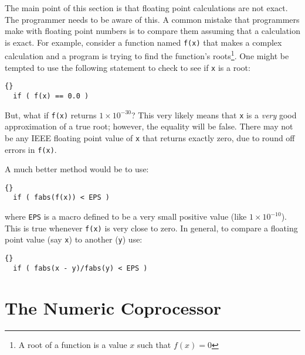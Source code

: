 {The main point of this section is that floating point calculations are
not exact. The programmer needs to be aware of this. A common mistake that
programmers make with floating point numbers is to compare them assuming
that a calculation is exact. For example, consider a function named
\lstinline|f(x)| that makes a complex calculation and a program is
trying to find the function's roots\footnote{A root of a function is a 
value $x$ such that $f(x) = 0$}. One might be tempted to use the following
statement to check to see if \lstinline|x| is a root:
\begin{lstlisting}[stepnumber=0]{}
  if ( f(x) == 0.0 )
\end{lstlisting}
But, what if \lstinline|f(x)| returns $1 \times 10^{-30}$? This very
likely means that \lstinline|x| is a \emph{very} good approximation of 
a true root; however, the equality will be false. There may not be any
IEEE floating point value of \lstinline|x| that returns exactly zero, due
to round off errors in \lstinline|f(x)|. 

A much better method would be to use:
\begin{lstlisting}[stepnumber=0]{}
  if ( fabs(f(x)) < EPS )
\end{lstlisting}
where \lstinline|EPS| is a macro defined to be a very small positive value
(like $1 \times 10^{-10}$). This is true whenever \lstinline|f(x)| is very
close to zero. In general, to compare a floating point value (say 
\lstinline|x|) to another (\lstinline|y|) use:
\begin{lstlisting}[stepnumber=0]{}
  if ( fabs(x - y)/fabs(y) < EPS )
\end{lstlisting}

\section{The Numeric Coprocessor}
}
